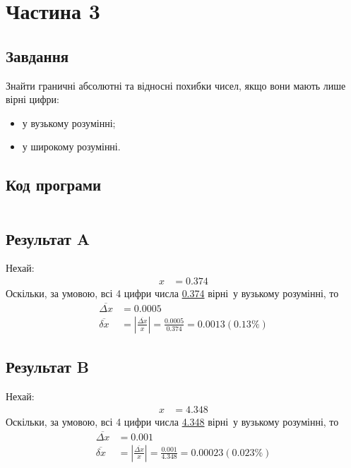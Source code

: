 \section{Частина 3}
\label{sec:task3}

\subsection{Завдання}
\label{subsec:task3_task}

Знайти граничні абсолютні та відносні похибки чисел,
якщо вони мають лише вірні цифри:
\begin{itemize}
    \item у вузькому розумінні;
    \item у широкому розумінні.
\end{itemize}

\subsection{Код програми}
\label{subsec:task3_code}
\inputminted{python}{../src/task3.py}

\subsection{Результат A}
\label{subsec:task3_narrow_result}

Нехай:
\begin{align}
    x & = 0.374
    \label{eq:task3_narrow_number}
\end{align}
Оскільки, за умовою, всі 4 цифри числа
\hyperref[eq:task3_narrow_number]{0.374}
вірні у вузькому розумінні, то
\begin{align}
    \overline{\Delta x} & = 0.0005
    \label{eq:task3_narrow_maximum_absolute_error} \\
    \overline{\delta x} & =
    |\frac{
        \hyperref[eq:task3_narrow_maximum_absolute_error]{\overline{\Delta x}}
    }{
        \hyperref[eq:task3_narrow_number]{x}
    }|
    = \frac{0.0005}{0.374} = 0.0013 (0.13\%)
    \label{eq:task3_narrow_maximum_relative_error}
\end{align}

\subsection{Результат B}
\label{subsec:task3_broad_result}

Нехай:
\begin{align}
    x & = 4.348
    \label{eq:task3_broad_number}
\end{align}
Оскільки, за умовою, всі 4 цифри числа
\hyperref[eq:task3_broad_number]{4.348}
вірні у вузькому розумінні, то
\begin{align}
    \overline{\Delta x} & = 0.001
    \label{eq:task3_broad_maximum_absolute_error} \\
    \overline{\delta x} & =
    |\frac{
        \hyperref[eq:task3_broad_maximum_absolute_error]{\overline{\Delta x}}
    }{
        \hyperref[eq:task3_broad_number]{x}
    }|
    = \frac{0.001}{4.348} = 0.00023 (0.023\%)
    \label{eq:task3_broad_maximum_relative_error}
\end{align}
